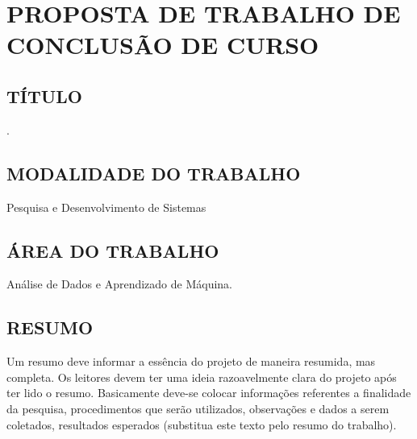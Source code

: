 
\chapter{PROPOSTA DE TRABALHO DE CONCLUSÃO DE CURSO}
\label{chap:proposta}

\section{TÍTULO}
\label{sec:titulo}
\thetitle.

\section{MODALIDADE DO TRABALHO}
\label{sec:modalidade}
Pesquisa e Desenvolvimento de Sistemas

\section{ÁREA DO TRABALHO}
\label{sec:area}
Análise de Dados e Aprendizado de Máquina.

\section{RESUMO}
\label{sec:resumo}
Um resumo deve informar a essência do projeto de maneira resumida, mas completa. Os leitores devem ter 
uma ideia razoavelmente clara do projeto após ter lido o resumo. Basicamente deve-se colocar informações 
referentes a finalidade da pesquisa, procedimentos que serão utilizados, observações e dados a serem coletados, 
resultados esperados (substitua este texto pelo resumo do trabalho).


